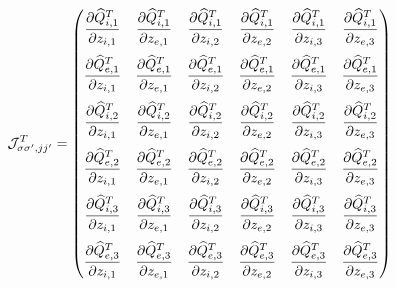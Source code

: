 \documentclass[12pt]{article}
\newcommand\qhat{\widehat{Q}}
\newcommand{\sspjjp}{{\sigma\sigma^\prime,jj^\prime}}
\begin{document}
\begin{equation}
{\cal J}^T_{\sspjjp} = \begin{pmatrix}
\displaystyle \frac{\partial \qhat^T_{i,1}}{\partial z_{i,1}} &
\displaystyle \frac{\partial \qhat^T_{i,1}}{\partial z_{e,1}} &
\displaystyle \frac{\partial \qhat^T_{i,1}}{\partial z_{i,2}} &
\displaystyle \frac{\partial \qhat^T_{i,1}}{\partial z_{e,2}} &
\displaystyle \frac{\partial \qhat^T_{i,1}}{\partial z_{i,3}} &
\displaystyle \frac{\partial \qhat^T_{i,1}}{\partial z_{e,3}} 
\medskip \\
\displaystyle \frac{\partial \qhat^T_{e,1}}{\partial z_{i,1}} &
\displaystyle \frac{\partial \qhat^T_{e,1}}{\partial z_{e,1}} &
\displaystyle \frac{\partial \qhat^T_{e,1}}{\partial z_{i,2}} &
\displaystyle \frac{\partial \qhat^T_{e,1}}{\partial z_{e,2}} &
\displaystyle \frac{\partial \qhat^T_{e,1}}{\partial z_{i,3}} &
\displaystyle \frac{\partial \qhat^T_{e,1}}{\partial z_{e,3}} 
\medskip \\
\displaystyle \frac{\partial \qhat^T_{i,2}}{\partial z_{i,1}} &
\displaystyle \frac{\partial \qhat^T_{i,2}}{\partial z_{e,1}} &
\displaystyle \frac{\partial \qhat^T_{i,2}}{\partial z_{i,2}} &
\displaystyle \frac{\partial \qhat^T_{i,2}}{\partial z_{e,2}} &
\displaystyle \frac{\partial \qhat^T_{i,2}}{\partial z_{i,3}} &
\displaystyle \frac{\partial \qhat^T_{i,2}}{\partial z_{e,3}} 
\medskip \\
\displaystyle \frac{\partial \qhat^T_{e,2}}{\partial z_{i,1}} &
\displaystyle \frac{\partial \qhat^T_{e,2}}{\partial z_{e,1}} &
\displaystyle \frac{\partial \qhat^T_{e,2}}{\partial z_{i,2}} &
\displaystyle \frac{\partial \qhat^T_{e,2}}{\partial z_{e,2}} &
\displaystyle \frac{\partial \qhat^T_{e,2}}{\partial z_{i,3}} &
\displaystyle \frac{\partial \qhat^T_{e,2}}{\partial z_{e,3}} 
\medskip \\
\displaystyle \frac{\partial \qhat^T_{i,3}}{\partial z_{i,1}} &
\displaystyle \frac{\partial \qhat^T_{i,3}}{\partial z_{e,1}} &
\displaystyle \frac{\partial \qhat^T_{i,3}}{\partial z_{i,2}} &
\displaystyle \frac{\partial \qhat^T_{i,3}}{\partial z_{e,2}} &
\displaystyle \frac{\partial \qhat^T_{i,3}}{\partial z_{i,3}} &
\displaystyle \frac{\partial \qhat^T_{i,3}}{\partial z_{e,3}} 
\medskip \\
\displaystyle \frac{\partial \qhat^T_{e,3}}{\partial z_{i,1}} &
\displaystyle \frac{\partial \qhat^T_{e,3}}{\partial z_{e,1}} &
\displaystyle \frac{\partial \qhat^T_{e,3}}{\partial z_{i,2}} &
\displaystyle \frac{\partial \qhat^T_{e,3}}{\partial z_{e,2}} &
\displaystyle \frac{\partial \qhat^T_{e,3}}{\partial z_{i,3}} &
\displaystyle \frac{\partial \qhat^T_{e,3}}{\partial z_{e,3}} 
\end{pmatrix}
\end{equation}
\end{document}
